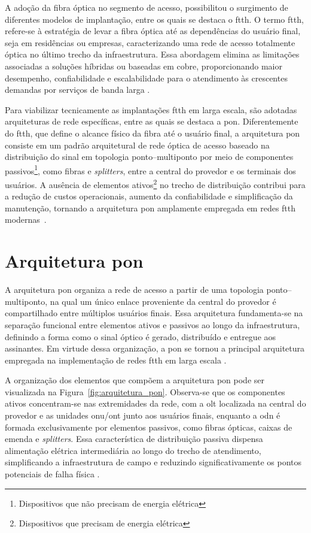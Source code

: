 A adoção da fibra óptica no segmento de acesso, possibilitou o surgimento de diferentes modelos de implantação, entre os quais se destaca o \gls{ftth}. O termo \gls{ftth}, refere-se à estratégia de levar a fibra óptica até as dependências do usuário final, seja em residências ou empresas, caracterizando uma rede de acesso totalmente óptica no último trecho da infraestrutura. Essa abordagem elimina as limitações associadas a soluções híbridas ou baseadas em cobre, proporcionando maior desempenho, confiabilidade e escalabilidade para o atendimento às crescentes demandas por serviços de banda larga \cite{oliviero2014fiber}.

Para viabilizar tecnicamente as implantações \gls{ftth} em larga escala, são adotadas arquiteturas de rede específicas, entre as quais se destaca a \gls{pon}. Diferentemente do \gls{ftth}, que define o alcance físico da fibra até o usuário final, a arquitetura \gls{pon} consiste em um padrão arquitetural de rede óptica de acesso baseado na distribuição do sinal em topologia ponto–multiponto por meio de componentes passivos\footnote{Dispositivos que não precisam de energia elétrica}, como fibras e \textit{splitters}, entre a central do provedor e os terminais dos usuários. A ausência de elementos ativos\footnote{Dispositivos que precisam de energia elétrica} no trecho de distribuição contribui para a redução de custos operacionais, aumento da confiabilidade e simplificação da manutenção, tornando a arquitetura \gls{pon} amplamente empregada em redes \gls{ftth} modernas~\cite{keiser2011pon}.

\section{Arquitetura \gls{pon}}

A arquitetura \gls{pon} organiza a rede de acesso a partir de uma topologia ponto--multiponto, na qual um único enlace proveniente da central do provedor é compartilhado entre múltiplos usuários finais. Essa arquitetura fundamenta-se na separação funcional entre elementos ativos e passivos ao longo da infraestrutura, definindo a forma como o sinal óptico é gerado, distribuído e entregue aos assinantes. Em virtude dessa organização, a \gls{pon} se tornou a principal arquitetura empregada na implementação de redes \gls{ftth} em larga escala \cite{itutg9841,keiser2011pon}.

A organização dos elementos que compõem a arquitetura \gls{pon} pode ser visualizada na Figura~\ref{fig:arquitetura_pon}. Observa-se que os componentes ativos concentram-se nas extremidades da rede, com a \gls{olt} localizada na central do provedor e as unidades \gls{onu}/\gls{ont} junto aos usuários finais, enquanto a \gls{odn} é formada exclusivamente por elementos passivos, como fibras ópticas, caixas de emenda e \textit{splitters}. Essa característica de distribuição passiva dispensa alimentação elétrica intermediária ao longo do trecho de atendimento, simplificando a infraestrutura de campo e reduzindo significativamente os pontos potenciais de falha física \cite{keiser2011pon}.

